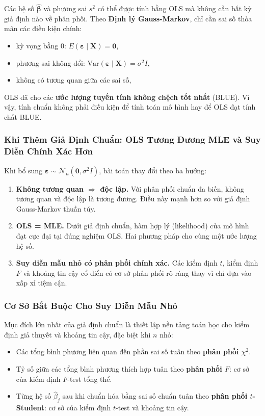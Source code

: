 Các hệ số $\hat{\boldsymbol{\beta}}$ và phương sai $s^2$ có thể được tính bằng OLS mà không cần bất kỳ giả định nào về phân phối. Theo \textbf{Định lý Gauss-Markov}, chỉ cần sai số thỏa mãn các điều kiện chính:
\begin{itemize}
  \item kỳ vọng bằng 0: $E(\boldsymbol{\varepsilon} \mid \mathbf{X}) = \mathbf{0}$,
  \item phương sai không đổi: $\mathrm{Var}(\boldsymbol{\varepsilon} \mid \mathbf{X}) = \sigma^2 I$,
  \item không có tương quan giữa các sai số,
\end{itemize}
OLS đã cho các \textbf{ước lượng tuyến tính không chệch tốt nhất} (BLUE). Vì vậy, tính chuẩn không phải điều kiện để tính toán mô hình hay để OLS đạt tính chất BLUE.

\subsubsection{Khi Thêm Giả Định Chuẩn: OLS Tương Đương MLE và Suy Diễn Chính Xác Hơn}

Khi bổ sung $\boldsymbol{\varepsilon} \sim \mathcal{N}_n(\mathbf{0}, \sigma^2 I)$, bài toán thay đổi theo ba hướng:

\begin{enumerate}
  \item \textbf{Không tương quan $\Rightarrow$ độc lập.} Với phân phối chuẩn đa biến, không tương quan và độc lập là tương đương. Điều này mạnh hơn so với giả định Gauss-Markov thuần túy.
  \item \textbf{OLS = MLE.} Dưới giả định chuẩn, hàm hợp lý (likelihood) của mô hình đạt cực đại tại đúng nghiệm OLS. Hai phương pháp cho cùng một ước lượng hệ số.
  \item \textbf{Suy diễn mẫu nhỏ có phân phối chính xác.} Các kiểm định $t$, kiểm định $F$ và khoảng tin cậy cổ điển có cơ sở phân phối rõ ràng thay vì chỉ dựa vào xấp xỉ tiệm cận.
\end{enumerate}

\subsubsection{Cơ Sở Bắt Buộc Cho Suy Diễn Mẫu Nhỏ}
\label{sec:normality_theory}

Mục đích lớn nhất của giả định chuẩn là thiết lập nền tảng toán học cho kiểm định giả thuyết và khoảng tin cậy, đặc biệt khi $n$ nhỏ:

\begin{itemize}
  \item Các tổng bình phương liên quan đến phần sai số tuân theo \textbf{phân phối $\chi^2$}.
  \item Tỷ số giữa các tổng bình phương thích hợp tuân theo \textbf{phân phối $F$}: cơ sở của kiểm định $F$-test tổng thể.
  \item Từng hệ số $\hat{\beta}_j$ sau khi chuẩn hóa bằng sai số chuẩn tuân theo \textbf{phân phối $t$-Student}: cơ sở của kiểm định $t$-test và khoảng tin cậy.
\end{itemize}


